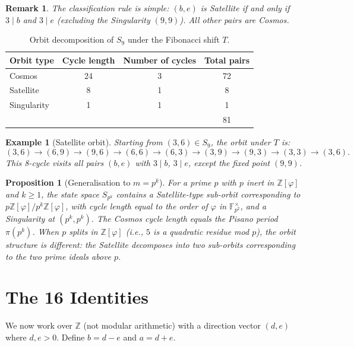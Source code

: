 \documentclass[11pt]{article}
\newtheorem{proposition}[definition]{Proposition}
\newtheorem{remark}[definition]{Remark}
\newtheorem{example}[definition]{Example}
\newcommand{\Zphi}{\mathbb{Z}[\varphi]}
\begin{document}
\begin{remark}
The classification rule is simple: $(b,e)$ is \emph{Satellite} if and only if $3 \mid b$ and $3 \mid e$ (excluding the Singularity $(9,9)$).  All other pairs are Cosmos.
\end{remark}

\begin{table}[h]
\centering
\begin{tabular}{lccc}
\toprule
\textbf{Orbit type} & \textbf{Cycle length} & \textbf{Number of cycles} & \textbf{Total pairs} \\
\midrule
Cosmos       & 24 & 3 & 72 \\
Satellite    & 8  & 1 & 8  \\
Singularity  & 1  & 1 & 1  \\
\midrule
             &    &   & 81 \\
\bottomrule
\end{tabular}
\caption{Orbit decomposition of $S_9$ under the Fibonacci shift $T$.}
\label{tab:orbits}
\end{table}

\begin{example}[Satellite orbit]
Starting from $(3,6) \in S_9$, the orbit under $T$ is:
\[
  (3,6) \to (6,9) \to (9,6) \to (6,6) \to (6,3) \to (3,9) \to (9,3) \to (3,3) \to (3,6).
\]
This 8-cycle visits all pairs $(b,e)$ with $3 \mid b$, $3 \mid e$, except the fixed point $(9,9)$.
\end{example}

\begin{proposition}[Generalisation to $m = p^k$]
For a prime $p$ with $p$ inert in $\Zphi$ and $k \geq 1$, the state space $S_{p^k}$ contains a Satellite-type sub-orbit corresponding to $p\Zphi / p^k\Zphi$, with cycle length equal to the order of $\varphi$ in $\mathbb{F}_{p^2}^\times$, and a Singularity at $(p^k, p^k)$.  The Cosmos cycle length equals the Pisano period $\pi(p^k)$.  When $p$ splits in $\Zphi$ (i.e., $5$ is a quadratic residue mod $p$), the orbit structure is different: the Satellite decomposes into two sub-orbits corresponding to the two prime ideals above $p$.
\end{proposition}

\section{The 16 Identities}\label{sec:16}

We now work over $\mathbb{Z}$ (not modular arithmetic) with a direction vector $(d,e)$ where $d,e > 0$.  Define $b = d - e$ and $a = d + e$.
\end{document}
